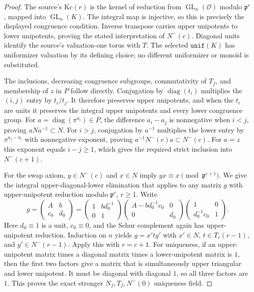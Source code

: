 \documentclass[11pt,a4paper]{article}
\numberwithin{equation}{section}
\theoremstyle{remark}\newtheorem{remark}[theorem]{Remark}
\begin{document}
\begin{proof}
The source's $\mathrm{Kc}(r)$ is the kernel of reduction from
$\operatorname{GL}_n(\mathcal O)$ modulo $\mathfrak p^r$, mapped
into $\operatorname{GL}_n(K)$.  The integral map is injective, so
this is precisely the displayed congruence condition.  Inverse
transpose carries upper unipotents to lower unipotents, proving
the stated interpretation of $N^-(c)$.  Diagonal units identify
the source's valuation-one torus with $T$.  The selected
$\texttt{unif}(K)$ has uniformizer valuation by its defining
choice; no different uniformizer or monoid is substituted.

The inclusions, decreasing congruence subgroups, commutativity
of $T_f$, and membership of $z$ in $P$ follow directly.
Conjugation by $\operatorname{diag}(t_i)$ multiplies the
$(i,\allowbreak{} j)$ entry by $t_i/t_j$.  It therefore preserves upper
unipotents, and when the $t_i$ are units it preserves the
integral upper unipotents and every lower congruence group.
For $a=\operatorname{diag}(\pi^{a_i})\in P$, the difference
$a_i-a_j$ is nonnegative when $i<j$, proving
$aNa^{-1}\subset N$.  For $i>j$, conjugation by $a^{-1}$
multiplies the lower entry by $\pi^{a_j-a_i}$ with
nonnegative exponent, proving
$a^{-1}N^-(c)a\subset N^-(c)$.  For $a=z$ this exponent
equals $i-j\geq1$, which gives the required strict inclusion
into $N^-(c+1)$.

For the swap axiom, $y\in N^-(c)$ and $x\in N$ imply
$yx\equiv x\pmod{\mathfrak p^{c+1}}$.  We give the integral
upper-diagonal-lower elimination that applies to any matrix
$g$ with upper-unipotent reduction modulo $\mathfrak p^r$,
$r\geq1$.  Write
\[
 g=\begin{pmatrix}A&b\\c_0&d_0\end{pmatrix}
   =\begin{pmatrix}1&bd_0^{-1}\\0&1\end{pmatrix}
    \begin{pmatrix}A-bd_0^{-1}c_0&0\\0&d_0\end{pmatrix}
    \begin{pmatrix}1&0\\d_0^{-1}c_0&1\end{pmatrix}.
\]
Here $d_0\equiv1$ is a unit, $c_0\equiv0$, and the Schur
complement again has upper-unipotent reduction.  Induction on
$n$ yields $g=x'ty'$ with $x'\in N$,
$t\in T_c(r-1)$, and $y'\in N^-(r-1)$.  Apply this with
$r=c+1$.  For uniqueness, if an upper-unipotent matrix times
a diagonal matrix times a lower-unipotent matrix is $1$,
then the first two factors give a matrix that is simultaneously
upper triangular and lower unipotent.  It must be diagonal
with diagonal $1$, so all three factors are $1$.  This proves
the exact stronger $N_f,\allowbreak{} T_f,\allowbreak{} N^-(0)$ uniqueness field.


\end{proof}
\end{document}
